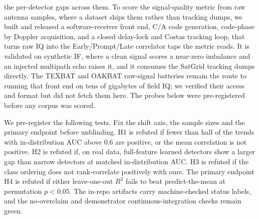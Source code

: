 \documentclass[conference]{IEEEtran}
\begin{document}
the per-detector gaps across them. To
score the signal-quality metric from raw antenna samples, where a dataset ships them
rather than tracking dumps, we built and released a software-receiver front end, C/A
code generation, code-phase by Doppler acquisition, and a closed delay-lock and Costas
tracking loop, that turns raw IQ into the Early/Prompt/Late correlator taps the metric
reads. It is validated on synthetic IF, where a clean signal scores a near-zero
imbalance and an injected multipath echo raises it, and it consumes the SatGrid
tracking dumps directly. The TEXBAT and OAKBAT raw-signal batteries remain the route
to running that front end on tens of gigabytes of field IQ; we verified their access
and format but did not fetch them here. The probes below were pre-registered before
any corpus was scored.

We pre-register the following tests. Fix the shift axis, the sample sizes and the
primary endpoint before unblinding. H1 is refuted if fewer than half of the trends
with in-distribution AUC above $0.6$ are positive, or the mean correlation is not
positive. H2 is refuted if, on real data, full-feature learned detectors show a
larger gap than narrow detectors at matched in-distribution AUC. H3 is refuted if
the class ordering does not rank-correlate positively with ours. The primary
endpoint H4 is refuted if either leave-one-out $R^2$ fails to beat predict-the-mean
at permutation $p<0.05$. The in-repo artifacts carry machine-checked status labels,
and the no-overclaim and demonstrator continuous-integration checks remain green.
\end{document}

